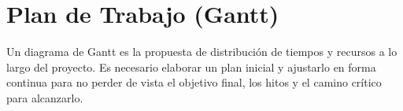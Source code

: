 \section{Plan de Trabajo (Gantt)}
\color{blue}Un diagrama de Gantt es la propuesta de distribución de tiempos y recursos a lo largo del proyecto. Es necesario elaborar un plan inicial y ajustarlo en forma continua para no perder de vista el objetivo final, los hitos y el camino crítico para alcanzarlo.\color{black}



